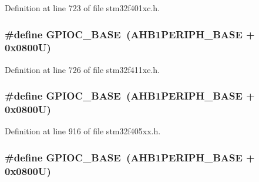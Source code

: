 Definition at line 723 of file stm32f401xc.\+h.

\subsubsection[{\texorpdfstring{G\+P\+I\+O\+C\+\_\+\+B\+A\+SE}{GPIOC_BASE}}]{\setlength{\rightskip}{0pt plus 5cm}\#define G\+P\+I\+O\+C\+\_\+\+B\+A\+SE~({\bf A\+H\+B1\+P\+E\+R\+I\+P\+H\+\_\+\+B\+A\+SE} + 0x0800\+U)}\hypertarget{group___peripheral__registers__structures_ga26f267dc35338eef219544c51f1e6b3f}{}\label{group___peripheral__registers__structures_ga26f267dc35338eef219544c51f1e6b3f}


Definition at line 726 of file stm32f411xe.\+h.

\subsubsection[{\texorpdfstring{G\+P\+I\+O\+C\+\_\+\+B\+A\+SE}{GPIOC_BASE}}]{\setlength{\rightskip}{0pt plus 5cm}\#define G\+P\+I\+O\+C\+\_\+\+B\+A\+SE~({\bf A\+H\+B1\+P\+E\+R\+I\+P\+H\+\_\+\+B\+A\+SE} + 0x0800\+U)}\hypertarget{group___peripheral__registers__structures_ga26f267dc35338eef219544c51f1e6b3f}{}\label{group___peripheral__registers__structures_ga26f267dc35338eef219544c51f1e6b3f}


Definition at line 916 of file stm32f405xx.\+h.

\subsubsection[{\texorpdfstring{G\+P\+I\+O\+C\+\_\+\+B\+A\+SE}{GPIOC_BASE}}]{\setlength{\rightskip}{0pt plus 5cm}\#define G\+P\+I\+O\+C\+\_\+\+B\+A\+SE~({\bf A\+H\+B1\+P\+E\+R\+I\+P\+H\+\_\+\+B\+A\+SE} + 0x0800\+U)}\hypertarget{group___peripheral__registers__structures_ga26f267dc35338eef219544c51f1e6b3f}{}\label{group___peripheral__registers__structures_ga26f267dc35338eef219544c51f1e6b3f}


